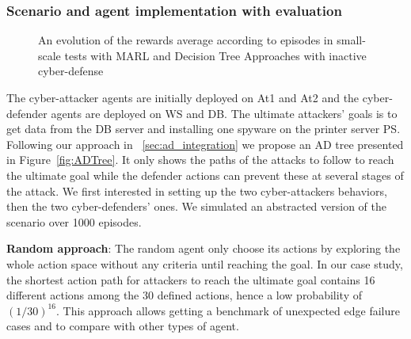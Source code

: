 


\subsubsection{Scenario and agent implementation with evaluation}

\begin{figure}
    \centering
    
    \caption{An evolution of the rewards average according to episodes in small-scale tests with MARL and Decision Tree Approaches with inactive cyber-defense
    }
    \label{fig:graphs}
\end{figure}

\noindent
The cyber-attacker agents are initially deployed on At1 and At2 and the cyber-defender agents are deployed on WS and DB. The ultimate attackers' goals is to get data from the DB server and installing one spyware on the printer server PS. Following our approach in ~\ref{sec:ad_integration} we propose an AD tree presented in Figure~\ref{fig:ADTree}. It only shows the paths of the attacks to follow to reach the ultimate goal while the defender actions can prevent these at several stages of the attack.
We first interested in setting up the two cyber-attackers behaviors, then the two cyber-defenders' ones. We simulated an abstracted version of the scenario over 1000 episodes.




\noindent
\textbf{Random approach}: \quad The random agent only choose its actions by exploring the whole action space without any criteria until reaching the goal. In our case study, the shortest action path for attackers to reach the ultimate goal contains 16 different actions among the 30 defined actions, hence a low probability of $(1/30)^{16}$.
This approach allows getting a benchmark of unexpected edge failure cases and to compare with other types of agent.

